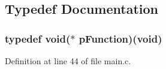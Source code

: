 \subsection{\-Typedef \-Documentation}
\hypertarget{group___pip_xtreme_b_l_ga9227bf1f1a9c633a0cc9ca50cc761c1a}{
\subsubsection[{p\-Function}]{\setlength{\rightskip}{0pt plus 5cm}typedef void($\ast$ {\bf p\-Function})(void)}}\label{group___pip_xtreme_b_l_ga9227bf1f1a9c633a0cc9ca50cc761c1a}


\-Definition at line 44 of file main.\-c.



